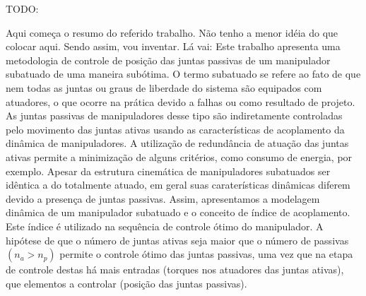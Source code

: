TODO:

Aqui começa o resumo do referido trabalho. Não tenho a menor idéia do que colocar aqui. Sendo assim, vou inventar. Lá vai: Este trabalho apresenta uma metodologia de controle de posição das juntas passivas de um manipulador subatuado de uma maneira subótima. O termo subatuado se refere ao fato de que nem todas as juntas ou graus de liberdade do sistema são equipados com atuadores, o que ocorre na prática devido a falhas ou como resultado de projeto. As juntas passivas de manipuladores desse tipo são indiretamente controladas pelo movimento das juntas ativas usando as características de acoplamento da dinâmica de manipuladores. A utilização de redundância de atuação das juntas ativas permite a minimização de alguns critérios, como consumo de energia, por exemplo.
Apesar da estrutura cinemática de manipuladores subatuados ser idêntica a do totalmente atuado, em geral suas caraterísticas dinâmicas diferem devido a presença de juntas passivas. Assim, apresentamos a modelagem dinâmica de um manipulador subatuado e o conceito de índice de acoplamento. Este índice é utilizado na sequência de controle ótimo do \mbox{manipulador}.
A hipótese de que o número de juntas ativas seja maior que o número de
passivas  $(n_{a} > n_{p})$  permite o controle ótimo das juntas passivas, uma vez que na etapa
de controle destas há mais entradas (torques nos atuadores das juntas ativas), que
elementos a controlar (posição das juntas passivas). 